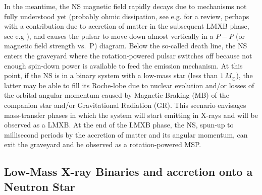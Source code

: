 \documentclass[graybox]{svmult}
\begin{document}
In the meantime, the NS magnetic field rapidly decays due to mechanisms not fully understood yet (probably ohmic dissipation, see e.g. \cite{Tauris2001} for a review, perhaps with a contribution due to accretion of matter in the subsequent LMXB phase, see e.g \cite{Cumming2001}), and causes the pulsar to move down almost vertically in a $P-\dot P$ (or magnetic field strength vs.\ P) diagram. Below the so-called death line, the NS enters the graveyard where the rotation-powered pulsar switches off because not enough spin-down power is available to feed the emission mechanism. At this point, if the NS is in a binary system with a low-mass star (less than $1\, M_\odot$), the latter may be able to fill its Roche-lobe due to nuclear evolution and/or losses of the orbital angular momentum caused by Magnetic Braking (MB) of the companion star and/or Gravitational Radiation (GR). This scenario envisages mass-transfer phases in which the system will start emitting in X-rays and will be observed as a LMXB. At the end of the LMXB phase, the NS, spun-up to millisecond periods by the accretion of matter and its angular momentum, can exit the graveyard and be observed as a rotation-powered MSP.


\subsection{Low-Mass X-ray Binaries and accretion onto a Neutron Star}
\end{document}

